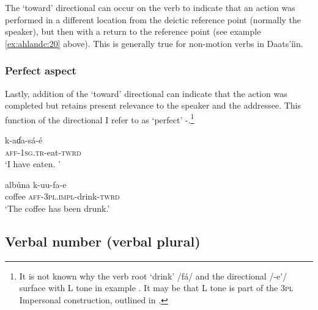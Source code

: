 \documentclass[output=paper]{langsci/langscibook}
\begin{document}
The ‘toward’ directional can occur on the verb to indicate that an action was performed in a different location from the deictic reference point (normally the speaker), but then with a return to the reference point (see example \ref{ex:ahlandc:20} above). This is generally true for non-motion verbs in Daats’íin.

\subsubsection{Perfect aspect}\label{sec:ahlandc:4.6.3}

Lastly, addition of the ‘toward’ directional can indicate that the action was completed but retains present relevance to the speaker and the addressee. This function of the directional I refer to as ‘perfect’ -.\footnote{It is not known why the verb root ‘drink’ /fá/ and the directional /-e\'{ }/ surface with L tone in example .  It may be that L tone is part of the 3\textsc{pl} Impersonal construction, outlined in .}

\ea\label{ex:ahlandc:34}
\gll
k-aɗa-sá-é  \\
\textsc{aff-1sg.tr}-eat-\textsc{twrd} \\
\glt
‘I have eaten. ’
\z

\ea\label{ex:ahlandc:35}
\gll
alb\'{u}na k-uu-fa-e \\
coffee \textsc{aff-3pl.impl}{}-drink-\textsc{twrd} \\
\glt
‘The coffee has been drunk.’
\z


\subsection{Verbal number (verbal plural)}\label{sec:ahlandc:4.7}
\end{document}
